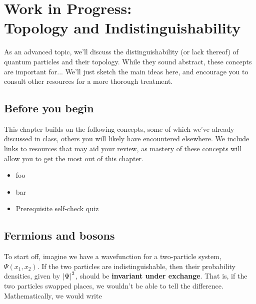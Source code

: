 \documentclass[12pt, english]{book}
\begin{document}
\chapter[Topology]{Work in Progress:\\Topology and Indistinguishability} \label{ch:topo}
As an advanced topic, we'll discuss the distinguishability (or lack thereof) of quantum particles and their topology.
While they sound abstract, these concepts are important for...
We'll just sketch the main ideas here, and encourage you to consult other resources for a more thorough treatment.


\section{Before you begin}

This chapter builds on the following concepts, some of which we've already discussed in class, others you will likely have encountered elsewhere.
We include links to resources that may aid your review, as mastery of these concepts will allow you to get the most out of this chapter.

\begin{itemize}
	\item foo 
	\item bar 
	\item Prerequisite self-check quiz 
\end{itemize}



\section{Fermions and bosons}

To start off, imagine we have a wavefunction for a two-particle system, $\Psi(x_1, x_2)$.
If the two particles are indistinguishable, then their probability densities, given by $\abs{\Psi}^2$, should be \textbf{invariant under exchange}.
That is, if the two particles swapped places, we wouldn't be able to tell the difference.
Mathematically, we would write
\end{document}
